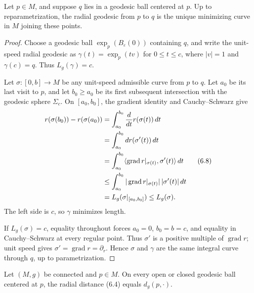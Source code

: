 \begin{proposition}
\label{prop:radial-geodesic-unique-minimizer}





Let $p\in M$, and suppose $q$ lies in a geodesic ball centered at $p$.  Up to
reparametrization, the radial geodesic from $p$ to $q$ is the unique
minimizing curve in $M$ joining these points.
\end{proposition}

\begin{proof}
\sketch
Choose a geodesic ball $\exp_p(B_\varepsilon(0))$ containing $q$, and write
the unit-speed radial geodesic as
$\gamma(t)=\exp_p(tv)$ for $0\leq t\leq c$, where $|v|=1$ and
$\gamma(c)=q$.  Thus $L_g(\gamma)=c$.

Let $\sigma:[0,b]\to M$ be any unit-speed admissible curve from $p$ to $q$.
Let $a_0$ be its last visit to $p$, and let $b_0\geq a_0$ be its first
subsequent intersection with the geodesic sphere $\Sigma_c$.  On
$[a_0,b_0]$, the gradient identity and Cauchy--Schwarz give
\begin{align}
r(\sigma(b_0))-r(\sigma(a_0))
&=\int_{a_0}^{b_0}\frac{d}{dt}r(\sigma(t))\,dt \notag\\
&=\int_{a_0}^{b_0}dr(\sigma'(t))\,dt \notag\\
&=\int_{a_0}^{b_0}
\langle\operatorname{grad}r|_{\sigma(t)},\sigma'(t)\rangle\,dt \tag{6.8}\\
&\leq\int_{a_0}^{b_0}
|\operatorname{grad}r|_{\sigma(t)}|\,|\sigma'(t)|\,dt \notag\\
&=L_g(\sigma|_{[a_0,b_0]})\leq L_g(\sigma). \notag
\end{align}
The left side is $c$, so $\gamma$ minimizes length.

If $L_g(\sigma)=c$, equality throughout forces
$a_0=0$, $b_0=b=c$, and equality in Cauchy--Schwarz at every regular point.
Thus $\sigma'$ is a positive multiple of $\operatorname{grad}r$; unit speed
gives $\sigma'=\operatorname{grad}r=\partial_r$.  Hence $\sigma$ and $\gamma$
are the same integral curve through $q$, up to parametrization.
\end{proof}

\begin{corollary}
\label{cor:radial-distance-riemannian-distance}





Let $(M,g)$ be connected and $p\in M$.  On every open or closed geodesic ball
centered at $p$, the radial distance (6.4) equals $d_g(p,\mathord\cdot)$.
\end{corollary}

